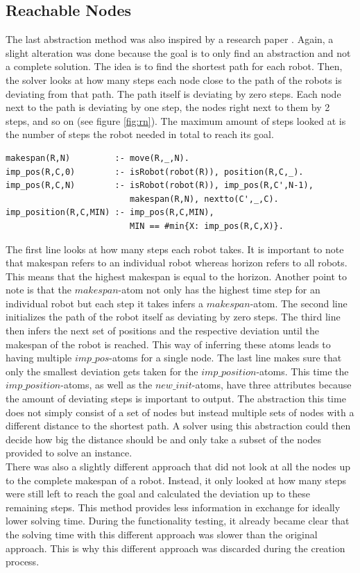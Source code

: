 \documentclass[runningheads]{llncs}
\begin{document}
\subsection{Reachable Nodes}
The last abstraction method was also inspired by a research paper \cite{rn}. Again, a slight alteration was done because the goal is to only find an abstraction and not a complete solution. The idea is to find the shortest path for each robot. Then, the solver looks at how many steps each node close to the path of the robots is deviating from that path. The path itself is deviating by zero steps. Each node next to the path is deviating by one step, the nodes right next to them by 2  steps, and so on (see figure \ref{fig:rn}). The maximum amount of steps looked at is the number of steps the robot needed in total to reach its goal. 
\begin{verbatim}
makespan(R,N)         :- move(R,_,N).
imp_pos(R,C,0)        :- isRobot(robot(R)), position(R,C,_).
imp_pos(R,C,N)        :- isRobot(robot(R)), imp_pos(R,C',N-1), 
                         makespan(R,N), nextto(C',_,C).
imp_position(R,C,MIN) :- imp_pos(R,C,MIN), 
                         MIN == #min{X: imp_pos(R,C,X)}.
\end{verbatim}
The first line looks at how many steps each robot takes. It is important to note that makespan refers to an individual robot whereas horizon refers to all robots. This means that the highest makespan is equal to the horizon. Another point to note is that the $makespan$-atom not only has the highest time step for an individual robot but each step it takes infers a $makespan$-atom. The second line initializes the path of the robot itself as deviating by zero steps. The third line then infers the next set of positions and the respective deviation until the makespan of the robot is reached. This way of inferring these atoms leads to having multiple $imp\_pos$-atoms for a single node. The last line makes sure that only the smallest deviation gets taken for the $imp\_position$-atoms. This time the $imp\_position$-atoms, as well as the $new\_init$-atoms, have three attributes because the amount of deviating steps is important to output. The abstraction this time does not simply consist of a set of nodes but instead multiple sets of nodes with a different distance to the shortest path. A solver using this abstraction could then decide how big the distance should be and only take a subset of the nodes provided to solve an instance. \\
There was also a slightly different approach that did not look at all the nodes up to the complete makespan of a robot. Instead, it only looked at how many steps were still left to reach the goal and calculated the deviation up to these remaining steps. This method provides less information in exchange for ideally lower solving time. During the functionality testing, it already became clear that the solving time with this different approach was slower than the original approach. This is why this different approach was discarded during the creation process.
\end{document}

